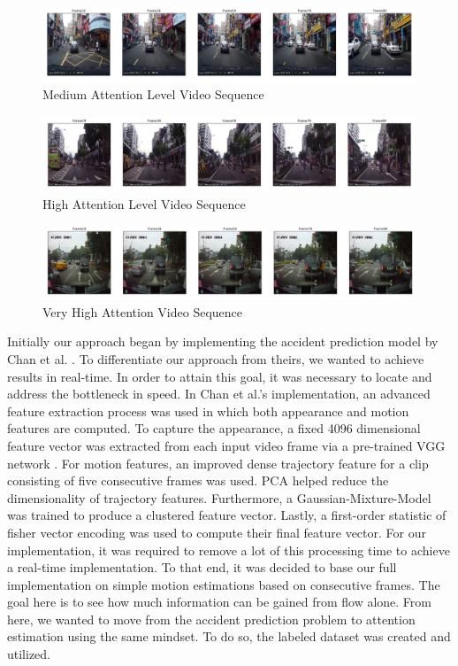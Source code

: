 \documentclass[10pt, conference, compsocconf]{IEEEtran}
\begin{document}
\begin{figure}[!t]
\centering
\includegraphics[width=6.5in]{images/level2}
\caption{Medium Attention Level Video Sequence}
\label{med}
\end{figure}

\begin{figure}[!t]
\centering
\includegraphics[width=6.5in]{images/level3}
\caption{High Attention Level Video Sequence}
\label{high}
\end{figure}

\begin{figure}[!t]
\centering
\includegraphics[width=6.5in]{images/level4}
\caption{Very High Attention Video Sequence}
\label{veryhigh}
\end{figure}

Initially our approach began by implementing the accident prediction model by Chan et al. \cite{10.1007/978-3-319-54190-7_9}. To differentiate our approach from theirs, we wanted to achieve results in real-time. In order to attain this goal, it was necessary to locate and address the bottleneck in speed. In Chan et al.'s implementation, an advanced feature extraction process was used in which both appearance and motion features are computed. To capture the appearance, a fixed 4096 dimensional feature vector was extracted from each input video frame via a pre-trained VGG network \cite{DBLP:journals/corr/SimonyanZ14a}. For motion features, an improved dense trajectory feature \cite{6751553} for a clip consisting of five consecutive frames was used. PCA helped reduce the dimensionality of trajectory features. Furthermore, a Gaussian-Mixture-Model was trained to produce a clustered feature vector. Lastly, a first-order statistic of fisher vector encoding was used to compute their final feature vector. For our implementation, it was required to remove a lot of this processing time to achieve a real-time implementation. To that end, it was decided to base our full implementation on simple motion estimations based on consecutive frames. The goal here is to see how much information can be gained from flow alone. From here, we wanted to move from the accident prediction problem to attention estimation using the same mindset. To do so, the labeled dataset was created and utilized.
\end{document}
